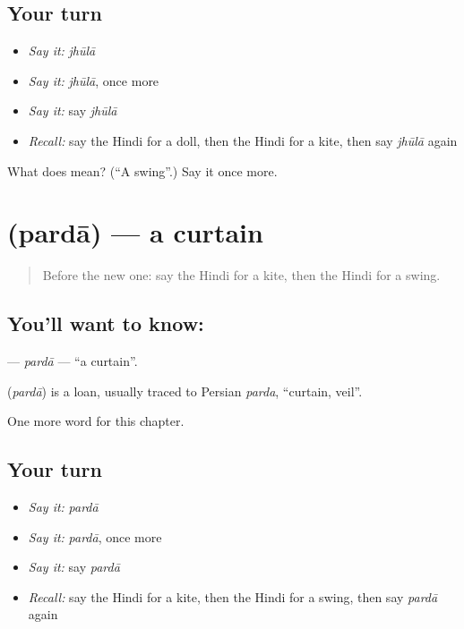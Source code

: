 \subsection*{Your turn}
\begin{itemize}
\raggedright
  \item \emph{Say it:} \emph{jhūlā}
  \item \emph{Say it:} \emph{jhūlā}, once more
  \item \emph{Say it:} say \emph{jhūlā}
  \item \emph{Recall:} say the Hindi for a doll, then the Hindi for a kite, then say \emph{jhūlā} again
\end{itemize}

\begin{tcolorbox}[breakable,colback=teal!4,colframe=teal!35!black,title={Before you move on}]
What does  mean? (\textquotedblleft{}A swing\textquotedblright{}.) Say it once more.
\end{tcolorbox}
\section[\texorpdfstring{\hi{पर्दा} (pardā)}{पर्दा (pardā)}]{ (pardā) — a curtain}

\label{lesson:HI-C265-parda}



\begin{quote}
Before the new one: say the Hindi for a kite, then the Hindi for a swing.
\end{quote}

\subsection*{You'll want to know: }
\textbf{} — \emph{pardā} — \textquotedblleft{}a curtain\textquotedblright{}.

\begin{cousinweb}
\textbf{} (\emph{pardā}) is a loan, usually traced to Persian \emph{parda}, \textquotedblleft{}curtain, veil\textquotedblright{}.
\end{cousinweb}

\begin{grammarlens}[title={What you've built}]
One more word for this chapter.
\end{grammarlens}

\subsection*{Your turn}
\begin{itemize}
\raggedright
  \item \emph{Say it:} \emph{pardā}
  \item \emph{Say it:} \emph{pardā}, once more
  \item \emph{Say it:} say \emph{pardā}
  \item \emph{Recall:} say the Hindi for a kite, then the Hindi for a swing, then say \emph{pardā} again
\end{itemize}

